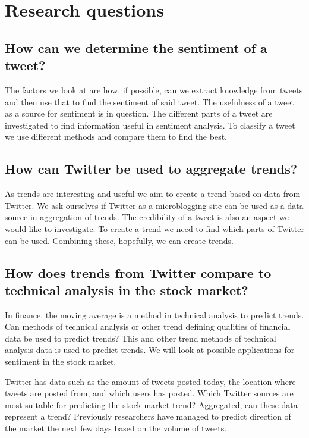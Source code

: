 \section{Research questions}\label{introduction:research_questions}

\subsection{How can we determine the sentiment of a
tweet?}\label{introduction:rq1}

The factors we look at are how, if possible, can we extract knowledge from
tweets and then use that to find the sentiment of said tweet. The usefulness of
a tweet as a source for sentiment is in question. The different parts of a
tweet are investigated to find information useful in sentiment analysis. To
classify a tweet we use different methods and compare them to find the best. 

\subsection{How can Twitter be used to aggregate trends?}\label{introduction:rq2}
As trends are interesting and useful we aim to create a trend based on data
from Twitter. We ask ourselves if Twitter as a microblogging site can be used as a
data source in aggregation of trends. The credibility of a tweet is also an
aspect we would like to investigate. To create a trend we need to find which
parts of Twitter can be used. Combining these, hopefully, we can create trends. 

\subsection{How does trends from Twitter compare to technical analysis in the
stock market?}\label{introduction:rq3}
In finance, the moving average is a method in technical analysis to predict
trends. Can methods of technical analysis or other trend defining qualities of
financial data be used to predict trends? This and other trend methods of
technical analysis data is used to predict trends.  We will look at possible
applications for sentiment in the stock market.

Twitter has data such as the amount of tweets posted today, the location where
tweets are posted from, and which users has posted. Which Twitter sources are
most suitable for predicting the stock market trend? Aggregated, can these data
represent a trend? Previously researchers have managed to predict
direction of the market the next few days based on the volume of tweets.  

